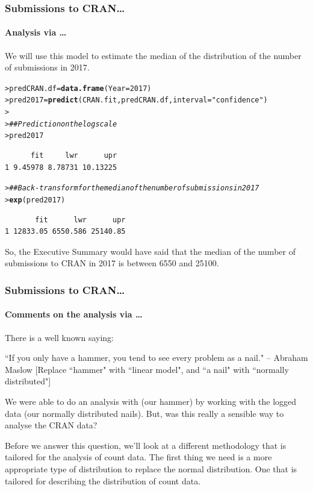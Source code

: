 \documentclass{beamer}\usepackage[]{graphicx}\usepackage[]{xcolor}
\makeatletter
\newcommand{\hlnum}[1]{\textcolor[rgb]{0.686,0.059,0.569}{#1}}%
\newcommand{\hlstr}[1]{\textcolor[rgb]{0.192,0.494,0.8}{#1}}%
\newcommand{\hlcom}[1]{\textcolor[rgb]{0.678,0.584,0.686}{\textit{#1}}}%
\newcommand{\hlstd}[1]{\textcolor[rgb]{0.345,0.345,0.345}{#1}}%
\newcommand{\hlkwb}[1]{\textcolor[rgb]{0.69,0.353,0.396}{#1}}%
\newcommand{\hlkwc}[1]{\textcolor[rgb]{0.333,0.667,0.333}{#1}}%
\newcommand{\hlkwd}[1]{\textcolor[rgb]{0.737,0.353,0.396}{\textbf{#1}}}%
\newenvironment{kframe}{%
 \def\at@end@of@kframe{}%
 \ifinner\ifhmode%
  \def\at@end@of@kframe{\end{minipage}}%
  \begin{minipage}{\columnwidth}%
 \fi\fi%
 \def\FrameCommand##1{\hskip\@totalleftmargin \hskip-\fboxsep
 \colorbox{shadecolor}{##1}\hskip-\fboxsep
     \hskip-\linewidth \hskip-\@totalleftmargin \hskip\columnwidth}%
 \MakeFramed {\advance\hsize-\width
   \@totalleftmargin\z@ \linewidth\hsize
   \@setminipage}}%
 {\par\unskip\endMakeFramed%
 \at@end@of@kframe}
\newenvironment{knitrout}{}{} %
\makeatother
\begin{document}
\begin{frame}[fragile]
\frametitle{Submissions to CRAN\ldots}
\framesubtitle{Analysis via \ldots}

We will use this model to estimate the median of the distribution of the number of submissions in 2017.
\bigskip


\begin{knitrout}\scriptsize
{}\color{fgcolor}\begin{kframe}
\begin{alltt}
\hlstd{> }\hlstd{predCRAN.df} \hlkwb{=} \hlkwd{data.frame}\hlstd{(}\hlkwc{Year} \hlstd{=} \hlnum{2017}\hlstd{)}
\hlstd{> }\hlstd{pred2017} \hlkwb{=} \hlkwd{predict}\hlstd{(CRAN.fit, predCRAN.df,} \hlkwc{interval} \hlstd{=} \hlstr{"confidence"}\hlstd{)}
\hlstd{> }
\hlstd{> }\hlcom{## Prediction on the log scale}
\hlstd{> }\hlstd{pred2017}
\end{alltt}
\begin{verbatim}
      fit     lwr      upr
1 9.45978 8.78731 10.13225
\end{verbatim}
\begin{alltt}
\hlstd{> }\hlcom{## Back-transform for the median of the number of submissions in 2017}
\hlstd{> }\hlkwd{exp}\hlstd{(pred2017)}
\end{alltt}
\begin{verbatim}
       fit      lwr      upr
1 12833.05 6550.586 25140.85
\end{verbatim}
\end{kframe}
\end{knitrout}

\medskip

So, the Executive Summary would have said that the median of the number of submissions to CRAN in 2017 is between 6550 and 25100. 

\end{frame}


\begin{frame}[fragile]
\frametitle{Submissions to CRAN\ldots}
\framesubtitle{Comments on the analysis via \ldots}
There is a well known saying:
\medskip

``If you only have a hammer, you tend to see every problem as a nail." -- Abraham Maslow [Replace ``hammer" with ``linear model", and ``a nail" with ``normally distributed"]
\bigskip

We were able to do an analysis with  (our hammer) by working with the logged data (our normally distributed nails). But, was this really a sensible way to analyse the CRAN data?
\bigskip

Before we answer this question, we'll look at a different methodology that is tailored for the analysis of count data. The first thing we need is a more appropriate type of distribution to replace the normal distribution. One that is tailored for describing the distribution of count data.
\end{frame}
\end{document}
